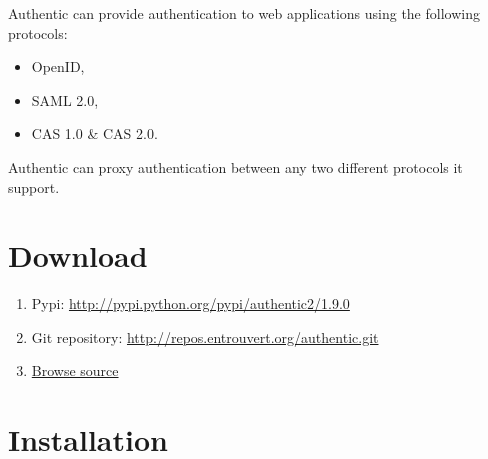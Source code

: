 \documentclass[letterpaper,10pt,english]{sphinxmanual}
\begin{document}
Authentic can provide authentication to web applications using the following
protocols:
\begin{itemize}
\item {} 
OpenID,

\item {} 
SAML 2.0,

\item {} 
CAS 1.0 \& CAS 2.0.

\end{itemize}

Authentic can proxy authentication between any two different protocols it
support.


\section{Download}
\label{download:download}\label{download::doc}\label{download:id1}\begin{enumerate}
\item {} 
Pypi: \href{http://pypi.python.org/pypi/authentic2/1.9.0}{http://pypi.python.org/pypi/authentic2/1.9.0}

\item {} 
Git repository: \href{http://repos.entrouvert.org/authentic.git}{http://repos.entrouvert.org/authentic.git}

\item {} 
\href{http://dev.entrouvert.org/projects/authentic/repository}{Browse source}

\end{enumerate}


\section{Installation}
\label{installation:installation}\label{installation::doc}\label{installation:id1}
\end{document}

